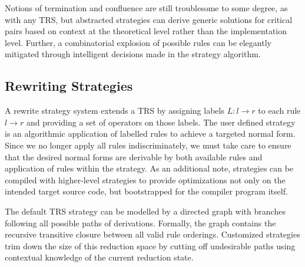 \documentclass{article}
\begin{document}
Notions of termination and confluence are still troublesome to some degree, as with any TRS, but abstracted strategies can derive
generic solutions for critical pairs based on context at the theoretical level rather than the implementation level.
Further, a combinatorial explosion of possible rules can be elegantly mitigated through intelligent decisions made in the strategy algorithm.


\subsection{Rewriting Strategies}

A rewrite strategy system extends a TRS by assigning labels $L: l \rightarrow r$ to each rule $l \rightarrow r$ and providing a set of operators on those labels.
The user defined strategy is an algorithmic application of labelled rules to achieve a targeted normal form. Since we no longer apply
all rules indiscriminately, we must take care to ensure that the desired normal forms are derivable by both available rules and application of rules within the strategy.
As an additional note, strategies can be compiled with higher-level strategies to provide optimizations not only on the intended target source code,
but bootstrapped for the compiler program itself.

The default TRS strategy can be modelled by a directed graph with branches following all possible paths of derivations.
Formally, the graph contains the recursive transitive closure between all valid rule orderings.
Customized strategies trim down the size of this reduction space by cutting off undesirable paths
using contextual knowledge of the current reduction state.
\end{document}
